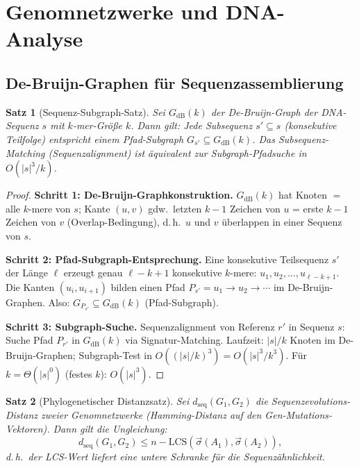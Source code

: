 ﻿\documentclass[a4paper,12pt]{article}
\theoremstyle{plain}
\newtheorem{satz}{Satz}
\theoremstyle{definition}
\theoremstyle{remark}
\newcommand{\sigvec}{\vec{\sigma}}
\begin{document}
\section{Genomnetzwerke und DNA-Analyse}

\subsection{De-Bruijn-Graphen f\"ur Sequenzassemblierung}

\begin{satz}[Sequenz-Subgraph-Satz]
\label{satz:seq_subgraph}
Sei $G_{\mathrm{dB}}(k)$ der De-Bruijn-Graph der DNA-Sequenz $s$ mit
$k$-mer-Gr\"o{\ss}e $k$.
Dann gilt: Jede Subsequenz $s' \subseteq s$ (konsekutive Teilfolge)
entspricht einem Pfad-Subgraph $G_{s'} \subseteq G_{\mathrm{dB}}(k)$.
Das Subsequenz-Matching (Sequenzalignment) ist \"aquivalent zur
Subgraph-Pfadsuche in $O(|s|^3 / k)$.
\end{satz}

\begin{proof}
\textbf{Schritt 1: De-Bruijn-Graphkonstruktion.}
$G_{\mathrm{dB}}(k)$ hat Knoten $= $ alle $k$-mere von $s$;
Kante $(u,v)$ gdw.\ letzten $k-1$ Zeichen von $u$ = erste $k-1$ Zeichen von $v$
(Overlap-Bedingung), d.\,h.\ $u$ und $v$ \"uberlappen in einer Sequenz von $s$.

\textbf{Schritt 2: Pfad-Subgraph-Entsprechung.}
Eine konsekutive Teilsequenz $s'$ der L\"ange $\ell$ erzeugt genau
$\ell - k + 1$ konsekutive $k$-mere: $u_1, u_2, \ldots, u_{\ell-k+1}$.
Die Kanten $(u_i, u_{i+1})$ bilden einen Pfad $P_{s'} = u_1 \to u_2 \to \cdots$
im De-Bruijn-Graphen.
Also: $G_{P_{s'}} \subseteq G_{\mathrm{dB}}(k)$ (Pfad-Subgraph).

\textbf{Schritt 3: Subgraph-Suche.}
Sequenzalignment von Referenz $r'$ in Sequenz $s$:
Suche Pfad $P_{r'}$ in $G_{\mathrm{dB}}(k)$ via Signatur-Matching.
Laufzeit: $|s|/k$ Knoten im De-Bruijn-Graphen;
Subgraph-Test in $O((|s|/k)^3) = O(|s|^3/k^3)$.
F\"ur $k = \Theta(|s|^0)$ (festes $k$): $O(|s|^3)$.
\end{proof}

\begin{satz}[Phylogenetischer Distanzsatz]
\label{satz:phylo_dist}
Sei $d_{\mathrm{seq}}(G_1, G_2)$ die Sequenzevolutions-Distanz zweier
Genomnetzwerke (Hamming-Distanz auf den Gen-Mutations-Vektoren).
Dann gilt die Ungleichung:
\[
d_{\mathrm{seq}}(G_1, G_2) \leq n - \mathrm{LCS}(\sigvec(A_1), \sigvec(A_2)),
\]
d.\,h.\ der LCS-Wert liefert eine untere Schranke f\"ur die Sequenzähnlichkeit.
\end{satz}
\end{document}
